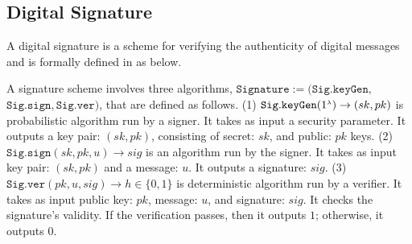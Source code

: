 











\vspace{-2.1mm}

\subsection{Digital Signature}\label{subsec:DS}

A digital signature is a scheme for verifying the authenticity of digital messages and is formally defined in \cite{DBLP:books/crc/KatzLindell2014}  as below.
%
%
\begin{definition}\label{sec::def}
A signature scheme  involves three algorithms, $\mathtt{Signature}:=(\mathtt{Sig.keyGen}, $ $\mathtt{Sig.sign}, \mathtt{Sig.ver})$, that are defined as follows. (1) $\mathtt{Sig.keyGen}(1^{\scriptscriptstyle \lambda})\rightarrow (sk,pk)$ is probabilistic algorithm run by  a  signer. It takes as input a security parameter. It outputs a key pair: $(sk,pk)$, consisting of secret: $sk$, and public: $pk$ keys. (2) $\mathtt{Sig.sign}(sk, pk, u)\rightarrow sig$ is an algorithm run by the signer. It takes as input  key pair: $(sk,pk)$ and a message: $u$. It outputs a signature: $sig$. (3) $\mathtt{Sig.ver}( pk, u, sig)\rightarrow h\in\{0,1\}$ is  deterministic algorithm run by a verifier. It takes as input  public key: $pk$,  message: $u$, and signature: $sig$. It checks the signature's validity.   If the verification passes, then it outputs $1$; otherwise, it outputs $0$. 
\end{definition}

